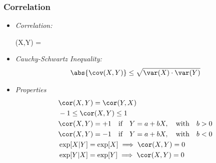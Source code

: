 

\begin{frame}
\frametitle{Correlation}
\begin{itemize}
\item \emph{Correlation:}
\begin{emphalign*}
\cor(X,Y) 
  = 
\end{emphalign*}
\vspace{1ex}
\item \emph{Cauchy-Schwartz Inequality:}
\begin{align*}
\abs{\cov(X,Y)} \leq \sqrt{\var(X) \cdot \var(Y)}
\end{align*}
\item \emph{Properties}
\vspace{-1ex}
\begin{align*}
& \cor(X,Y) = \cor(Y,X)\\
& -1 \leq \cor(X,Y) \leq 1\\
& \cor(X,Y) = + 1 \quad\text{if}\quad Y = a + b X, \quad\text{with}\quad b>0\\
& \cor(X,Y) = - 1 \quad\text{if}\quad Y = a + b X, \quad\text{with}\quad b<0\\
& \exp[X|Y] = \exp[X] \implies \cor(X,Y) = 0\\
& \exp[Y|X] = \exp[Y] \implies \cor(X,Y) = 0 
\end{align*}
\end{itemize}
\end{frame}

